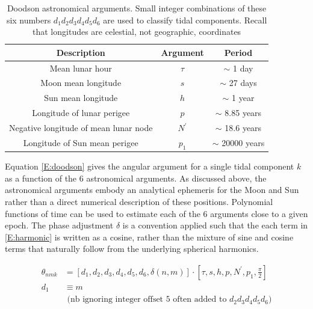 \begin{table}[htp]
\caption{Doodson astronomical arguments.  Small integer combinations of these six numbers $d_1 d_2 d_3 d_4 d_5 d_6$ are used to classify tidal components.  Recall that longitudes are celestial, not geographic, coordinates}
\begin{center} 
\begin{tabular}{|c|c|c|}
\hline
Description                            & Argument          & Period\\
\hline
Mean lunar hour                        & $\tau$            & $\sim$ 1 day      \\
Moon mean longitude                    & $s$               & $\sim$ 27 days    \\  
Sun mean longitude                     & $h$               & $\sim$ 1 year     \\
Longitude of lunar perigee             & $p$               & $\sim$ 8.85 years \\
Negative longitude of mean lunar node  & $N^\prime$        & $\sim$ 18.6 years \\
Longitude of Sun mean perigee          & $p_1$             & $\sim$ 20000 years\\
\hline
\end{tabular} 
\end{center}
\label{T:doodson}
\end{table}


Equation \ref{E:doodson} gives the angular argument for a single tidal component $k$ as a function of the 6 astronomical arguments.   As discussed above, the astronomical arguments embody an analytical ephemeris for the Moon and Sun rather than a direct numerical description of these positions.  Polynomial functions of time can be used to estimate each of the 6 arguments close to a given epoch.  The phase adjustment $\delta$ is a convention applied such that the each term in \ref{E:harmonic} is written as a cosine, rather than the mixture of sine and cosine terms that naturally follow from the underlying spherical harmonics.

\begin{align}
\label{E:doodson}
\theta_{nmk}  &= \left[ d_1 , d_2 , d_3 , d_4 , d_5 ,d_6 , \delta(n,m)  \right] \cdot \left[ \tau , s  , h , p , N^\prime , p_1 , \frac{\pi}{2}   \right]   \\
          d_1 &\equiv m \nonumber \\
              & \mbox{ (nb ignoring integer offset 5 often added to $d_2d_3d_4d_5d_6$)} \nonumber
\end{align}

